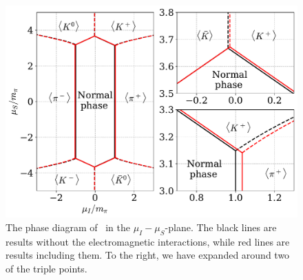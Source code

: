 \begin{figure}[h]
    \centering
    \includegraphics[width=.9\textwidth]{../scripts/figurer/phase_diagram_EM.pdf}
    \caption{
        The phase diagram of \chpt\ in the $\mu_I-\mu_S$-plane.
        The black lines are results without the electromagnetic interactions, while red lines are results including them. 
        To the right, we have expanded around two of the triple points.
        }
    \label{fig: phase diagram EM}
\end{figure}



